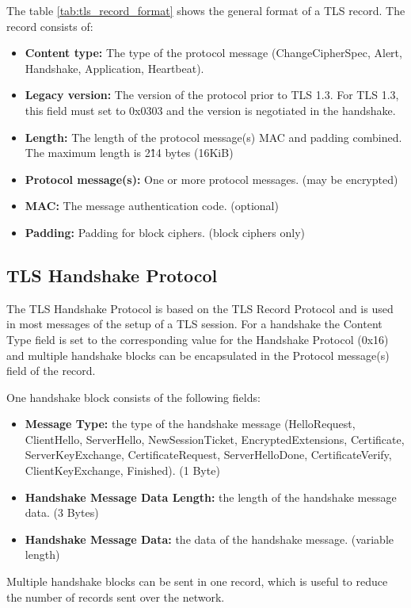The table \ref{tab:tls_record_format} shows the general format of a TLS record. The record consists of:
\begin{itemize}
    \item \textbf{Content type:} The type of the protocol message (ChangeCipherSpec, Alert, Handshake, Application, Heartbeat).
    \item \textbf{Legacy version:} The version of the protocol prior to TLS 1.3. For TLS 1.3, this field must set to 0x0303 and the version is negotiated in the handshake.
    \item \textbf{Length:} The length of the protocol message(s) MAC and padding combined. The maximum length is 2\^14 bytes (16KiB)
    \item \textbf{Protocol message(s):} One or more protocol messages. (may be encrypted)
    \item \textbf{MAC:} The message authentication code. (optional)
    \item \textbf{Padding:} Padding for block ciphers. (block ciphers only)
\end{itemize}


\subsection{TLS Handshake Protocol}

The TLS Handshake Protocol is based on the TLS Record Protocol and is used in most messages of the setup of a TLS session. For a handshake the Content Type field is set to the corresponding value for the Handshake Protocol (0x16) and multiple handshake blocks can be encapsulated in the Protocol message(s) field of the record. 

One handshake block consists of the following fields:
\begin{itemize}
    \item \textbf{Message Type:} the type of the handshake message (HelloRequest, ClientHello, ServerHello, NewSessionTicket, EncryptedExtensions, Certificate, ServerKeyExchange, CertificateRequest, ServerHelloDone, CertificateVerify, ClientKeyExchange, Finished). (1 Byte)
    \item \textbf{Handshake Message Data Length:} the length of the handshake message data. (3 Bytes)
    \item \textbf{Handshake Message Data:} the data of the handshake message. (variable length)
\end{itemize}

Multiple handshake blocks can be sent in one record, which is useful to reduce the number of records sent over the network. 

